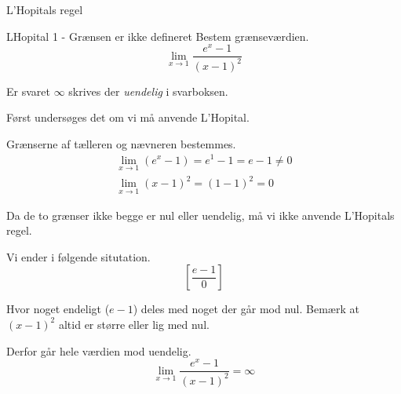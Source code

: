 \documentclass{article}
\begin{document}
L'Hopitals regel
\tableofcontents
\newpage

\begin{exercise}{LHopital 1 - Grænsen er ikke defineret}
Bestem grænseværdien.
\[
\lim_{x \to 1} \frac{e^x - 1}{(x - 1)^2}
\]

Er svaret $\infty$ skrives der \emph{uendelig} i svarboksen.


\hint
Først undersøges det om vi må anvende L'Hopital.

\hint
Grænserne af tælleren og nævneren bestemmes.
\begin{align*}
\lim_{x \to 1} (e^x - 1) = e^1 - 1 = e - 1 \neq 0 \\
\lim_{x \to 1} (x - 1)^2 = (1 - 1)^2 = 0
\end{align*}

\hint
Da de to grænser ikke begge er nul eller uendelig, må vi ikke anvende L'Hopitals regel. 

\hint
Vi ender i følgende situtation.
\[
\left[ \frac{e - 1}{0} \right]
\]

\hint
Hvor noget endeligt ($e - 1$) deles med noget der går mod nul.
Bemærk at $(x - 1)^2$ altid er større eller lig med nul. 

Derfor går hele værdien mod uendelig.
\[
\lim_{x \to 1} \frac{e^x - 1}{(x - 1)^2} = \infty
\]

\end{exercise}
\end{document}
